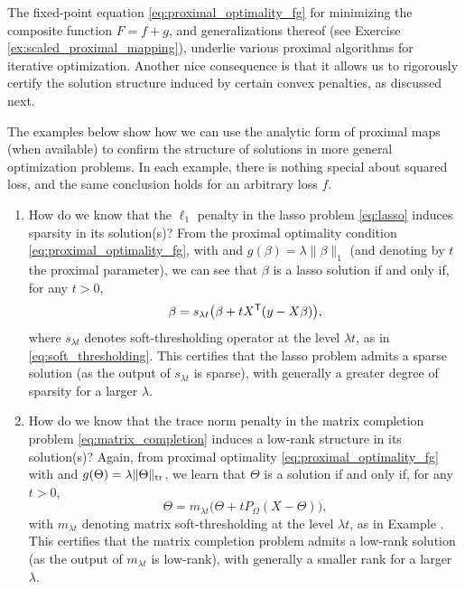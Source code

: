 The fixed-point equation \eqref{eq:proximal_optimality_fg} for minimizing the
composite function $F = f+g$, and generalizations thereof (see Exercise
\ref{ex:scaled_proximal_mapping}), underlie various proximal algorithms for    
iterative optimization. Another nice consequence is that it allows us to
rigorously certify the solution structure induced by certain convex penalties,
as discussed next.    

\begin{Example}
\label{xa:proximal_optimality}
The examples below show how we can use the analytic form of proximal maps (when
available) to confirm the structure of solutions in more general optimization
problems. In each example, there is nothing special about squared loss, and the
same conclusion holds for an arbitrary loss $f$.   

\begin{enumerate}[label=\alph*., ref=\alph*]
\item How do we know that the $\ell_1$ penalty in the lasso problem
  \eqref{eq:lasso} induces sparsity in its solution(s)? From the proximal
  optimality condition \eqref{eq:proximal_optimality_fg}, with  and $g(\beta) = \lambda \|\beta\|_1$
  (and denoting by $t$ the proximal parameter), we can see that $\beta$ is a
  lasso solution if and only if, for any $t>0$,   
  \[
  \beta = s_{\lambda t} \big( \beta + t X^{\mathsf{T}} (y - X\beta) \big),
  \]
  where $s_{\lambda t}$ denotes soft-thresholding operator at the level
  $\lambda t$, as in \eqref{eq:soft_thresholding}. This certifies that the lasso
  problem admits a sparse solution (as the output of $s_{\lambda t}$ is sparse),
  with generally a greater degree of sparsity for a larger $\lambda$.     

\item How do we know that the trace norm penalty in the matrix completion
  problem \eqref{eq:matrix_completion} induces a low-rank structure in its
  solution(s)? Again, from proximal optimality \eqref{eq:proximal_optimality_fg}
  with  and
  $g(\Theta) = \lambda \|\Theta\|_{\operatorname{tr}}$, we learn that $\Theta$ is a solution
  if and only if, for any $t>0$, 
  \[
  \Theta = m_{\lambda t} \big( \Theta + t P_\Omega (X - \Theta) \big),
  \]
  with $m_{\lambda t}$ denoting matrix soft-thresholding at the level $\lambda
  t$, as in Example . This certifies that
  the matrix completion problem admits a low-rank solution (as the output of
  $m_{\lambda t}$ is low-rank), with generally a smaller rank for a larger
  $\lambda$.      
\end{enumerate}
\end{Example}

